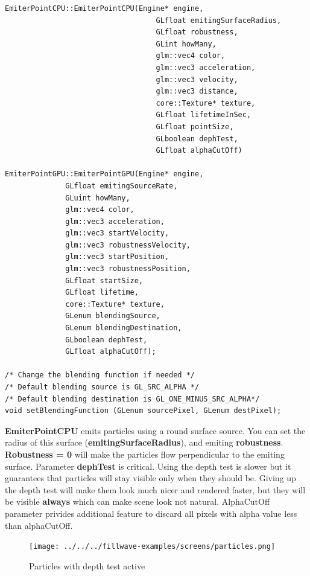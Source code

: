 \documentclass{article}
\begin{document}
\begin{lstlisting}
EmiterPointCPU::EmiterPointCPU(Engine* engine,
                                   GLfloat emitingSurfaceRadius,
                                   GLfloat robustness,
                                   GLint howMany,
                                   glm::vec4 color,
                                   glm::vec3 acceleration,
                                   glm::vec3 velocity,
                                   glm::vec3 distance,
                                   core::Texture* texture,
                                   GLfloat lifetimeInSec,
                                   GLfloat pointSize,
                                   GLboolean dephTest,
                                   GLfloat alphaCutOff)
                                   
EmiterPointGPU::EmiterPointGPU(Engine* engine,
              GLfloat emitingSourceRate,
              GLuint howMany,
              glm::vec4 color,
              glm::vec3 acceleration,
              glm::vec3 startVelocity,
              glm::vec3 robustnessVelocity,
              glm::vec3 startPosition,
              glm::vec3 robustnessPosition,
              GLfloat startSize,
              GLfloat lifetime,
	          core::Texture* texture,
	          GLenum blendingSource,
	          GLenum blendingDestination,
	          GLboolean dephTest,
	          GLfloat alphaCutOff);

/* Change the blending function if needed */
/* Default blending source is GL_SRC_ALPHA */
/* Default blending destination is GL_ONE_MINUS_SRC_ALPHA*/
void setBlendingFunction (GLenum sourcePixel, GLenum destPixel);

\end{lstlisting}

\indent \textbf{EmiterPointCPU} emits particles using a round surface source. You can set the radius of this surface (\textbf{emitingSurfaceRadius}), and emiting \textbf{robustness}. \textbf{Robustness = 0} will make the particles flow perpendicular to the emiting surface. Parameter \textbf{dephTest} is critical. Using the depth test is slower but it guarantees that particles will stay visible only when they should be. Giving up the depth test will make them look much nicer and rendered faster, but they will be visible \textbf{always} which can make scene look not natural. AlphaCutOff parameter privides additional feature to discard all pixels with alpha value less than alphaCutOff.

\begin{figure}
    \centering
    \texttt{[image: ../../../fillwave-examples/screens/particles.png]}
    \caption{Particles with depth test active}
    \label{particle_depth_test}
\end{figure}
\end{document}
